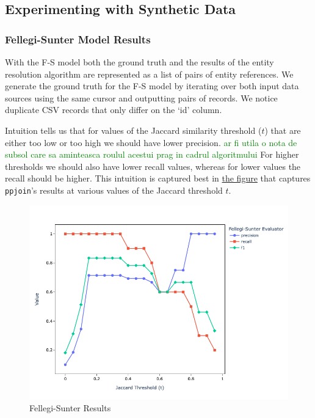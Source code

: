 \documentclass[lettersize,journal]{IEEEtran}
\begin{document}
    \subsection{Experimenting with Synthetic Data}

    \subsubsection{Fellegi-Sunter Model Results}
    
    With the F-S model both the ground truth and the results of the entity
    resolution algorithm are represented as a list of pairs of entity
    references.
    We generate the ground truth for the F-S model by iterating over both
    input data sources using the same cursor and outputting pairs of records.
    We notice duplicate CSV records that only differ on the `id' column.

    Intuition tells us that for values of the Jaccard similarity threshold ($t$)
    that are either too low or too high we should have lower precision.
    \textcolor{green}{ar fi utila o nota de subsol care sa aminteasca roulul acestui prag in cadrul algoritmului} 
    For higher thresholds we should also have lower recall values, whereas for
    lower values the recall should be higher.
    This intuition is captured best in \hyperref[fsfig]{the figure} that
    captures \texttt{ppjoin}'s results at various values of the Jaccard
    threshold $t$.

    \begin{figure}
        \centering
        \includegraphics[width=\textwidth]{mini-fs}
        \caption{Fellegi-Sunter Results}\label{fsfig}
    \end{figure}
\end{document}

